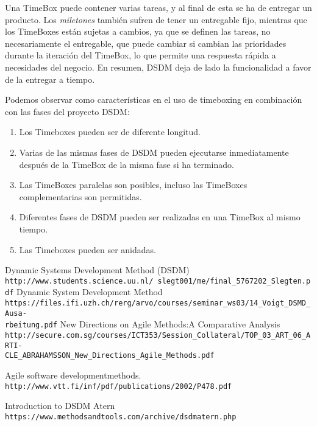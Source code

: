 \documentclass[12pt,a4paper]{article}
\begin{document}
 Una TimeBox puede contener varias tareas, y al final de esta se ha de entregar un producto. Los \emph{miletones} también
sufren de tener un entregable fijo, mientras que los TimeBoxes están sujetas a cambios, ya que se definen las tareas, no necesariamente el entregable, que puede cambiar si cambian las prioridades durante la iteración del TimeBox, lo que permite una respuesta rápida a necesidades del negocio. En resumen, DSDM deja de lado la funcionalidad a favor de la entregar a tiempo.

Podemos observar como características en el uso de timeboxing en combinación con las fases del proyecto DSDM:
\begin{enumerate}
	\item  Los Timeboxes pueden ser de diferente longitud.
	\item  Varias de las mismas fases de DSDM pueden ejecutarse inmediatamente después de la TimeBox de la misma fase si ha terminado.
\item Las TimeBoxes paralelas son posibles, incluso las TimeBoxes complementarias son permitidas.
\item Diferentes fases de DSDM pueden ser realizadas en una TimeBox al mismo tiempo.
\item Las Timeboxes pueden ser anidadas.
\end{enumerate}


\begin{thebibliography}{9}

 Dynamic Systems Development Method (DSDM)
\\\texttt{http://www.students.science.uu.nl/~slegt001/me/final\_5767202\_Slegten.pdf}
Dynamic System Development Method
\\\texttt{https://files.ifi.uzh.ch/rerg/arvo/courses/seminar\_ws03/14\_Voigt\_DSMD\_Ausa-\\rbeitung.pdf}
New Directions on Agile Methods:A Comparative Analysis
\\\texttt{http://secure.com.sg/courses/ICT353/Session\_Collateral/TOP\_03\_ART\_06\_ARTI-\\CLE\_ABRAHAMSSON\_New\_Directions\_Agile\_Methods.pdf}

Agile software developmentmethods.
\\\texttt{http://www.vtt.fi/inf/pdf/publications/2002/P478.pdf}


Introduction to DSDM Atern
\\\texttt{https://www.methodsandtools.com/archive/dsdmatern.php}
\end{thebibliography}
\end{document}
